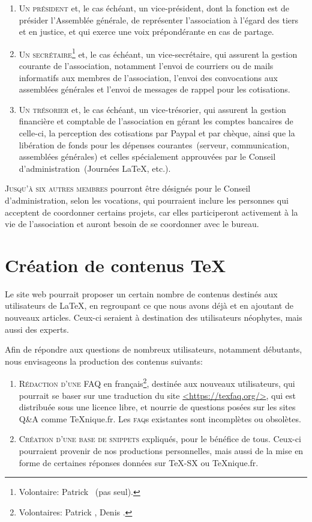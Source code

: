 \documentclass{tufte-handout}
\newcommand{\ratio}[3][]{\marginpar{\footnotesize{\textcolor{teal}{Temps requis: #2 / Utilité: #3}\par\noindent \textcolor{teal}{#1}}}}
\begin{document}
\begin{enumerate}
	\item\textsc{Un président} et, le cas échéant, un vice-président, dont la fonction est de présider l'Assemblée générale, de représenter l'association à l'égard des tiers et en justice, et qui exerce une voix prépondérante en cas de partage.
	\item\textsc{Un secrétaire}\footnote{Volontaire: Patrick ~(pas seul).} et, le cas échéant, un vice-secrétaire, qui assurent la gestion courante de l'association, notamment l'envoi de courriers ou de mails informatifs aux membres de l'association, l'envoi des convocations aux assemblées générales et l'envoi de messages de rappel pour les cotisations.
	\item\textsc{Un trésorier} et, le cas échéant, un vice-trésorier, qui assurent la gestion financière et comptable de l'association en gérant les comptes bancaires de celle-ci, la perception des cotisations par Paypal et par chèque, ainsi que la libération de fonds pour les dépenses courantes~(serveur, communication, assemblées générales) et celles spécialement approuvées par le Conseil d'administration~(Journées \LaTeX, etc.).
\end{enumerate}

\textsc{Jusqu'à six autres membres} pourront être désignés pour le Conseil d'administration, selon les vocations, qui pourraient inclure les personnes qui acceptent de coordonner certains projets, car elles participeront activement à la vie de l'association et auront besoin de se coordonner avec le bureau.

\section{Création de contenus \TeX}

Le site web pourrait proposer un certain nombre de contenus destinés aux utilisateurs de \LaTeX, en regroupant ce que nous avons déjà et en ajoutant de nouveaux articles. Ceux-ci seraient à destination des utilisateurs néophytes, mais aussi des experts.

Afin de répondre aux questions de nombreux utilisateurs, notamment débutants, nous envisageons la production des contenus suivants:

\begin{enumerate}
	\item\textsc{Rédaction d'une FAQ}\ratio[Effort collectif possible]{+++}{+++} en français\footnote{Volontaires: Patrick , Denis .}, destinée aux nouveaux utilisateurs, qui pourrait se baser sur une traduction du site \url{<https://texfaq.org/>}, qui est distribuée sous une licence libre, et nourrie de questions posées sur les sites Q\&A comme \TeX nique.fr. Les \textsc{faq}s existantes sont incomplètes ou obsolètes.
	\item\textsc{Création d'une base de snippets}\ratio[Petites contributions régulières, sur le long terme]{++}{+++}  expliqués, pour le bénéfice de tous. Ceux-ci pourraient provenir de nos productions personnelles, mais aussi de la mise en forme de certaines réponses données sur TeX-SX ou \TeX nique.fr.
\end{enumerate}
\end{document}
